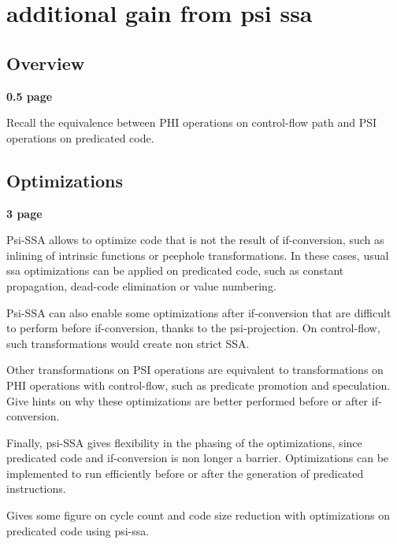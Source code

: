 \chapter{additional gain from psi ssa }




\section{Overview}

\textbf{0.5 page}

Recall the equivalence between PHI operations on control-flow path and PSI operations on predicated code.


\section{Optimizations}

\textbf{3 page}

Psi-SSA allows to optimize code that is not the result of if-conversion, such as inlining of intrinsic functions or peephole transformations. In these cases, usual ssa optimizations can be applied on predicated code, such as constant propagation, dead-code elimination or value numbering.

Psi-SSA can also enable some optimizations after if-conversion that are difficult to perform before if-conversion, thanks to the psi-projection. On control-flow, such transformations would create non strict SSA.

Other transformations on PSI operations are equivalent to transformations on PHI operations with control-flow, such as predicate promotion and speculation. Give hints on why these optimizations are better performed before or after if-conversion.

Finally, psi-SSA gives flexibility in the phasing of the optimizations, since predicated code and if-conversion is non longer a barrier. Optimizations can be implemented to run efficiently before or after the generation of predicated instructions.

Gives some figure on cycle count and code size reduction with optimizations on predicated code using psi-ssa.
